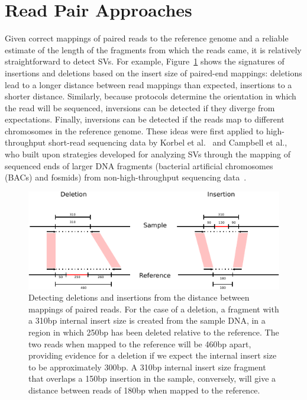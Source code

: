 \section{Read Pair Approaches}\label{section_read_pair}

Given correct mappings of paired reads to the reference genome and a reliable estimate of the length of the fragments from which the reads came, it is relatively straightforward to detect SVs. For example, Figure~\ref{rp_signatures} shows the signatures of insertions and deletions based on the insert size of paired-end mappings: deletions lead to a longer distance between read mappings than expected, insertions to a shorter distance. Similarly, because protocols determine the orientation in which the read will be sequenced, inversions can be detected if they diverge from expectations. Finally, inversions can be detected if the reads map to different chromosomes in the reference genome. These ideas were first applied to high-throughput short-read sequencing data by Korbel et al.~\cite{Korbel:2007p544} and Campbell et al.\cite{Campbell:2008p539}, who built upon strategies developed for analyzing SVs through the mapping of sequenced ends of larger DNA fragments (bacterial artificial chromosomes (BACs) and fosmids) from non-high-throughput sequencing data~\cite{Volik:2003fh,Raphael:2003ug,Tuzun:2005bp}.

\begin{figure}
\centering
\includegraphics[width=\textwidth]{figures/rp_signatures.pdf}
\caption{Detecting deletions and insertions from the distance between mappings of paired reads. For the case of a deletion, a fragment with a 310bp internal insert size is created from the sample DNA, in a region in which 250bp has been deleted relative to the reference. The two reads when mapped to the reference will be 460bp apart, providing evidence for a deletion if we expect the internal insert size to be approximately 300bp. A 310bp internal insert size fragment that overlaps a 150bp insertion in the sample, conversely, will give a distance between reads of 180bp when mapped to the reference.}
\label{rp_signatures}
\end{figure}

